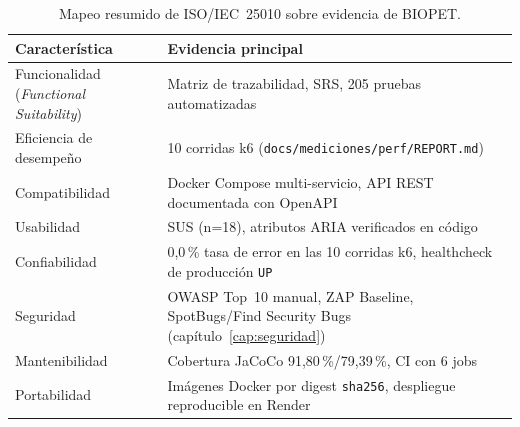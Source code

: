 \begin{table}[H]
  \centering
  \small
  \caption{Mapeo resumido de ISO/IEC~25010 sobre evidencia de BIOPET.}
  \label{tab:iso25010-resumen}
  \begin{tabular}{@{}p{3.4cm}p{9.4cm}@{}}
    \toprule
    Caracter\'istica & Evidencia principal \\
    \midrule
    Funcionalidad (\emph{Functional Suitability}) & Matriz de trazabilidad, SRS, 205 pruebas automatizadas \\
    Eficiencia de desempe\~no & 10 corridas k6 (\texttt{docs/mediciones/perf/REPORT.md}) \\
    Compatibilidad & Docker Compose multi-servicio, API REST documentada con OpenAPI \\
    Usabilidad & SUS (n=18), atributos ARIA verificados en c\'odigo \\
    Confiabilidad & 0{,}0\,\% tasa de error en las 10 corridas k6, healthcheck de producci\'on \texttt{UP} \\
    Seguridad & OWASP Top~10 manual, ZAP Baseline, SpotBugs/Find Security Bugs (cap\'itulo~\ref{cap:seguridad}) \\
    Mantenibilidad & Cobertura JaCoCo 91{,}80\,\%/79{,}39\,\%, CI con 6 jobs \\
    Portabilidad & Im\'agenes Docker por digest \texttt{sha256}, despliegue reproducible en Render \\
    \bottomrule
  \end{tabular}
\end{table}
